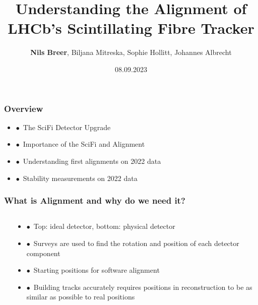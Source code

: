 \documentclass[xcolor=dvipsnames, aspectratio=1610, 12pt]{beamer}
\title{Understanding the Alignment of LHCb's Scintillating Fibre Tracker}
\author[N.Breer]{\textbf{Nils Breer}, Biljana Mitreska, Sophie Hollitt, Johannes Albrecht}
\institute{Maria Laach high energy physics school, Siegen}
\date{08.09.2023}
\begin{document}
\maketitle

\begin{frame}\frametitle{Overview}
  \begin{itemize}
    \item $\bullet$\, The SciFi Detector Upgrade
    \item $\bullet$\, Importance of the SciFi and Alignment
    \item $\bullet$\, Understanding first alignments on 2022 data
    \item $\bullet$\, Stability measurements on 2022 data
  \end{itemize}
\end{frame}

\begin{frame}\frametitle{What is Alignment and why do we need it?}
  \begin{columns}
    \begin{column}[c]{0.48\textwidth}
      
    \end{column}
    \begin{column}[c]{0.48\textwidth}
      \begin{itemize}
        \item $\bullet$\, Top: ideal detector, bottom: physical detector
        \item $\bullet$\, Surveys are used to find the rotation and position of each detector component
        \item $\bullet$\, \to Starting positions for software alignment
        \item $\bullet$\, Building tracks accurately requires positions in reconstruction to be as similar as possible to real positions
      \end{itemize}
    \end{column}
  \end{columns}
\end{frame}
\end{document}
